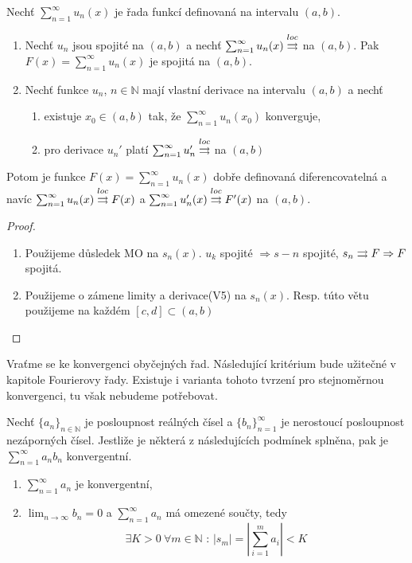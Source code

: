 \begin{vetal}
\label{o spojitosti a derivování řad funkcí}
Nechť $\sum_{n=1}^{\infty} u_n (x)$ je řada funkcí definovaná na intervalu $(a,b)$.
\begin{enumerate}
\item Nechť $u_n$ jsou spojité na $(a,b)$ a nechť $\sum_{n=1}^{\infty} u_n (x) \overset{loc}{\rightrightarrows}$ na $(a,b)$. Pak $F (x) = \sum_{n=1}^{\infty} u_n (x)$ je spojitá na $(a,b)$.
\item Nechť funkce $u_n$, $n \in \mathbb{N}$ mají vlastní derivace na intervalu $(a,b)$ a nechť
	\begin{enumerate}
	\item existuje $x_0 \in (a,b)$ tak, že $\sum_{n=1}^{\infty} u_n (x_0)$ konverguje,
	\item pro derivace $u_n'$ platí $\sum_{n=1}^{\infty} u_n' \overset{loc}{\rightrightarrows}$ na $(a,b)$
	\end{enumerate}
\end{enumerate}
Potom je funkce $F(x) = \sum_{n=1}^{\infty} u_n (x)$ dobře definovaná diferencovatelná a navíc $\sum_{n=1}^{\infty} u_n (x) \overset{loc}{\rightrightarrows} F(x)$ a $\sum_{n=1}^{\infty} u'_n (x) \overset{loc}{\rightrightarrows} F'(x)$ na $(a,b)$.
\end{vetal}
\begin{proof}
\begin{enumerate}

\item Použijeme důsledek MO na $s_n(x) $. $u_k $ spojité $\Rightarrow s-n$ spojité, $s_n \rightrightarrows F \Rightarrow F$ spojitá.
\item Použijeme o zámene limity a derivace(V5) na $s_n(x)$. Resp. túto větu použijeme na každém $[c,d] \subset (a,b)$
\end{enumerate}
\end{proof}

Vraťme se ke konvergenci obyčejných řad. Následující kritérium bude užitečné v kapitole Fourierovy řady. Existuje i varianta tohoto tvrzení pro stejnoměrnou konvergenci, tu však nebudeme potřebovat.

\begin{vetabd}
Nechť $\{a_n\}_{n \in \mathbb{N}}$ je posloupnost reálných čísel a $\{b_n\}_{n=1}^{\infty}$ je nerostoucí posloupnost nezáporných čísel. Jestliže je některá z následujících podmínek splněna, pak je $\sum_{n=1}^{\infty} a_n b_n$ konvergentní.
\begin{enumerate}
\item $\sum_{n=1}^{\infty} a_n$ je konvergentní,
\item $\lim_{n \rightarrow \infty} b_n = 0$ a $\sum_{n=1}^{\infty} a_n$ má omezené součty, tedy
$$\exists K > 0 \ \forall m \in \mathbb{N} \textrm{ : } | s_m | = \left| \sum_{i=1}^{m} a_i \right| < K$$
\end{enumerate}
\end{vetabd}
